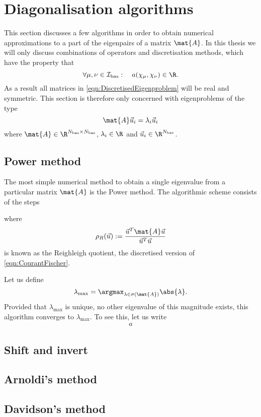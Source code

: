 \section{Diagonalisation algorithms}
\label{sec:DiagAlgos}

This section discusses a few algorithms in order to obtain
numerical approximations to a part of the eigenpairs of a matrix $\mat{A}$.
In this thesis we will only discuss combinations of operators
and discretisation methods, which have the property that
\[ \forall \mu, \nu \in \Ibas: \quad a(\chi_\mu, \chi_\nu) \in \R. \]
As a result all matrices in \eqref{eqn:DiscretisedEigenproblem}
will be real and symmetric.
This section is therefore only concerned with eigenproblems of the type
\[ \mat{A} \vec{u}_i = \lambda_i \vec{u}_i \]
where $\mat{A} \in \R^{\Nbas \times \Nbas}$,
$\lambda_i \in \R$ and $\vec{u}_i \in \R^{\Nbas}$.

\subsection{Power method}
The most simple numerical method to obtain
a single eigenvalue from a particular matrix $\mat{A}$
is the Power method.
The algorithmic scheme consists of the steps


where
\[ \rho_R(\vec{u}) := \frac{\vec{u}^T \mat{A} \vec{u}}{\vec{u}^T \vec{u}} \]
is known as the Reighleigh quotient,
the discretised version of \eqref{eqn:CourantFischer}.

Let us define
\[ \lambda_\text{max} = \argmax_{\lambda \in \sigma(\mat{A})} \abs{\lambda}. \]
Provided that $\lambda_\text{max}$ is unique,
\ie no other eigenvalue of this magnitude exists,
this algorithm converges to $\lambda_\text{max}$.
To see this, let us write
\begin{align}
	a
\end{align}




\subsection{Shift and invert}

\subsection{Arnoldi's method}

\subsection{Davidson's method}
